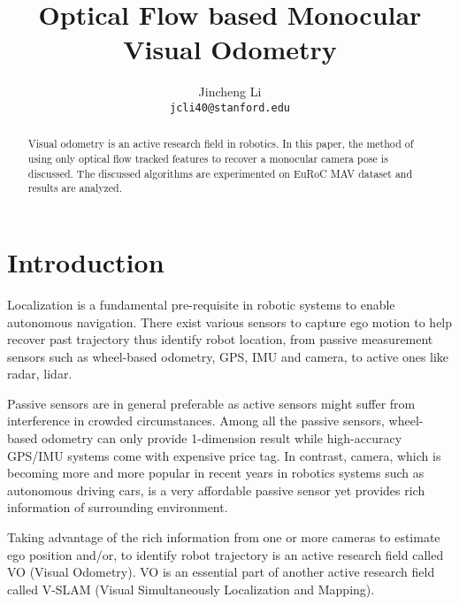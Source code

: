 \documentclass[10pt,twocolumn,letterpaper]{article}
\begin{document}
\title{Optical Flow based Monocular Visual Odometry}

\author{Jincheng Li\\
{\tt\small jcli40@stanford.edu}
}

\maketitle

\begin{abstract}
   Visual odometry is an active research field in robotics. In this paper, 
   the method of using only optical flow tracked features to recover a 
   monocular camera pose is discussed. The discussed algorithms are 
   experimented on EuRoC MAV dataset and results are analyzed. 
\end{abstract}

\section{Introduction}

Localization is a fundamental pre-requisite in robotic systems to enable autonomous 
navigation. There exist various sensors to capture ego motion to help recover past trajectory thus identify robot location, from passive measurement sensors such as wheel-based odometry, GPS, IMU and camera, to active ones like radar, lidar. 

Passive sensors are in general preferable as active sensors might suffer from interference in crowded circumstances. Among all the passive sensors, wheel-based odometry can only provide 1-dimension result while high-accuracy GPS/IMU systems come with expensive price tag. In contrast, camera, which is becoming more and more popular in recent years in robotics systems such as autonomous driving cars, is a very affordable passive sensor yet provides rich information of surrounding environment. 

Taking advantage of the rich information from one or more cameras to estimate ego position and/or, to identify robot trajectory is an active research field called VO (Visual Odometry). VO is an essential part of another active research field called V-SLAM (Visual Simultaneously Localization and Mapping).
\end{document}

